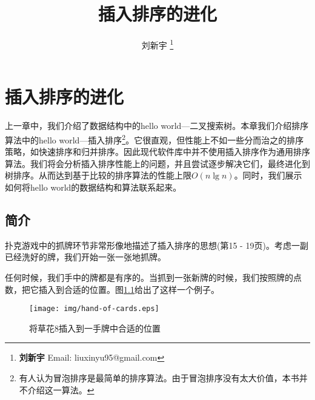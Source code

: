 \documentclass[UTF8]{article}
\begin{document}


\title{插入排序的进化}

\author{刘新宇
\thanks{{\bfseries 刘新宇} \newline
  Email: liuxinyu95@gmail.com \newline}
  }

\maketitle
\fi


\ifx\wholebook\relax
\chapter{插入排序的进化}
\fi

上一章中，我们介绍了数据结构中的hello world—二叉搜索树。本章我们介绍排序算法中的hello world—插入排序\footnote{有人认为冒泡排序是最简单的排序算法。由于冒泡排序没有太大价值，本书并不介绍这一算法\cite{wiki-bubble-sort}。}。它很直观，但性能上不如一些分而治之的排序策略，如快速排序和归并排序。因此现代软件库中并不使用插入排序作为通用排序算法。我们将会分析插入排序性能上的问题，并且尝试逐步解决它们，最终进化到树排序。从而达到基于比较的排序算法的性能上限$O(n \lg n)$。同时，我们展示如何将hello world的数据结构和算法联系起来。

\section{简介}
\label{introduction} 
扑克游戏中的抓牌环节非常形像地描述了插入排序的思想(\cite{CLRS}第15 - 19页)。考虑一副已经洗好的牌，我们开始一张一张地抓牌。

任何时候，我们手中的牌都是有序的。当抓到一张新牌的时候，我们按照牌的点数，把它插入到合适的位置。图\ref{fig:hand-of-cards}给出了这样一个例子。

\begin{figure}[htbp]
  \centering
  \texttt{[image: img/hand-of-cards.eps]}
  \caption{将草花8插入到一手牌中合适的位置}
  \label{fig:hand-of-cards}
\end{figure}
\end{document}
